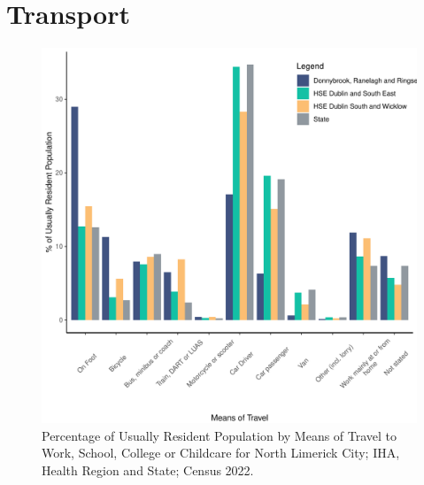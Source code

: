 \documentclass{article}
\begin{document}
\section{Transport}\label{sect:Trans}
\begin{figure}[H]
	\centering
	\includegraphics[width = 120mm]{../figures/TravelED.pdf}
	\caption{Percentage of Usually Resident Population by Means of Travel to Work, School, College or Childcare for North Limerick City; IHA, Health Region and State; Census 2022.}
	\label{fig:vbnv}
	\end{figure}
\end{document}
